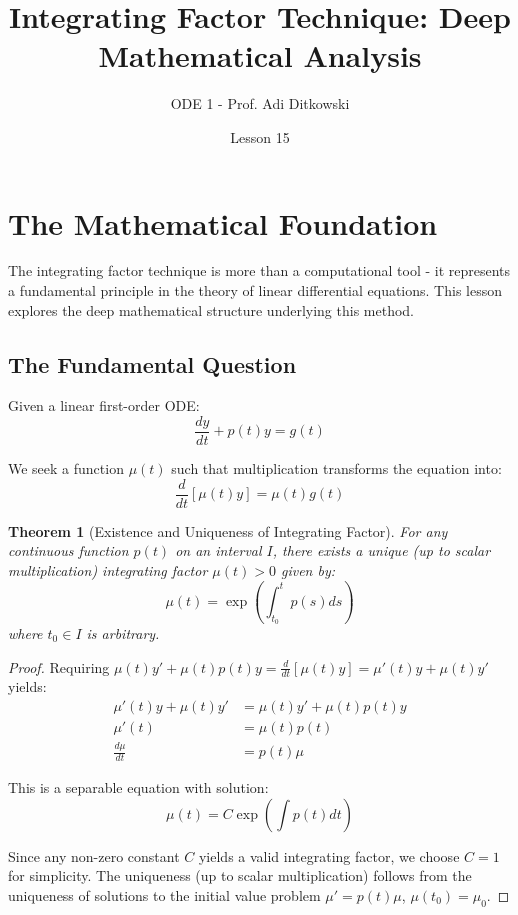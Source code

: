 \documentclass[12pt]{article}
\title{Integrating Factor Technique: Deep Mathematical Analysis}
\author{ODE 1 - Prof. Adi Ditkowski}
\date{Lesson 15}
\newtheorem{theorem}{Theorem}
\begin{document}
\maketitle

\section{The Mathematical Foundation}

The integrating factor technique is more than a computational tool - it represents a fundamental principle in the theory of linear differential equations. This lesson explores the deep mathematical structure underlying this method.

\subsection{The Fundamental Question}

Given a linear first-order ODE:
\begin{equation}
\frac{dy}{dt} + p(t)y = g(t)
\end{equation}

We seek a function $\mu(t)$ such that multiplication transforms the equation into:
\begin{equation}
\frac{d}{dt}[\mu(t)y] = \mu(t)g(t)
\end{equation}

\begin{theorem}[Existence and Uniqueness of Integrating Factor]
For any continuous function $p(t)$ on an interval $I$, there exists a unique (up to scalar multiplication) integrating factor $\mu(t) > 0$ given by:
\begin{equation}
\mu(t) = \exp\left(\int_{t_0}^t p(s)ds\right)
\end{equation}
where $t_0 \in I$ is arbitrary.
\end{theorem}

\begin{proof}
Requiring $\mu(t)y' + \mu(t)p(t)y = \frac{d}{dt}[\mu(t)y] = \mu'(t)y + \mu(t)y'$ yields:
\begin{align}
\mu'(t)y + \mu(t)y' &= \mu(t)y' + \mu(t)p(t)y \\
\mu'(t) &= \mu(t)p(t) \\
\frac{d\mu}{dt} &= p(t)\mu
\end{align}

This is a separable equation with solution:
\begin{equation}
\mu(t) = C\exp\left(\int p(t)dt\right)
\end{equation}

Since any non-zero constant $C$ yields a valid integrating factor, we choose $C = 1$ for simplicity. The uniqueness (up to scalar multiplication) follows from the uniqueness of solutions to the initial value problem $\mu'= p(t)\mu$, $\mu(t_0) = \mu_0$.
\end{proof}
\end{document}
